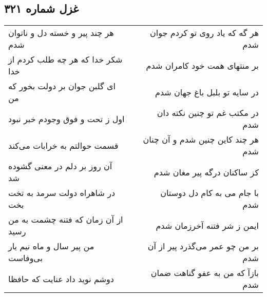 \begin{center}
\section*{غزل شماره ۳۲۱}
\label{sec:sh321}
\begin{longtable}{l p{0.5cm} r}
هر چند پیر و خسته دل و ناتوان شدم
&&
هر گه که یاد روی تو کردم جوان شدم
\\
شکر خدا که هر چه طلب کردم از خدا
&&
بر منتهای همت خود کامران شدم
\\
ای گلبن جوان بر دولت بخور که من
&&
در سایه تو بلبل باغ جهان شدم
\\
اول ز تحت و فوق وجودم خبر نبود
&&
در مکتب غم تو چنین نکته دان شدم
\\
قسمت حوالتم به خرابات می‌کند
&&
هر چند کاین چنین شدم و آن چنان شدم
\\
آن روز بر دلم در معنی گشوده شد
&&
کز ساکنان درگه پیر مغان شدم
\\
در شاهراه دولت سرمد به تخت بخت
&&
با جام می به کام دل دوستان شدم
\\
از آن زمان که فتنه چشمت به من رسید
&&
ایمن ز شر فتنه آخرزمان شدم
\\
من پیر سال و ماه نیم یار بی‌وفاست
&&
بر من چو عمر می‌گذرد پیر از آن شدم
\\
دوشم نوید داد عنایت که حافظا
&&
بازآ که من به عفو گناهت ضمان شدم
\\
\end{longtable}
\end{center}
